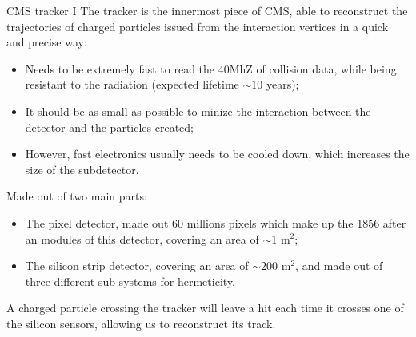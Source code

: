 \documentclass[8pt]{beamer}
\begin{document}
\begin{frame}{CMS tracker I}
\justifying
The tracker is the innermost piece of CMS, able to reconstruct the trajectories of charged particles issued from the interaction vertices in a quick and precise way:
\begin{itemize}
\justifying
\item Needs to be extremely fast to read the 40MhZ of collision data, while being resistant to the radiation (expected lifetime $\sim 10$ years);
\item It should be as small as possible to minize the interaction between the detector and the particles created;
\item However, fast electronics usually needs to be cooled down, which increases the size of the subdetector.
\end{itemize} \vfill

Made out of two main parts: 
\begin{itemize}
\justifying
\item The \alert{pixel detector}, made out 60 millions pixels which make up the 1856 after an modules of this detector, covering an area of $\sim 1$ m$^2$;
\item The \alert{silicon strip detector}, covering an area of $\sim 200$ m$^2$, and made out of three different sub-systems for hermeticity.
\end{itemize} \vfill

A charged particle crossing the tracker will leave a hit each time it crosses one of the silicon sensors, allowing us to reconstruct its track. \vfill
\end{frame}
\end{document}
